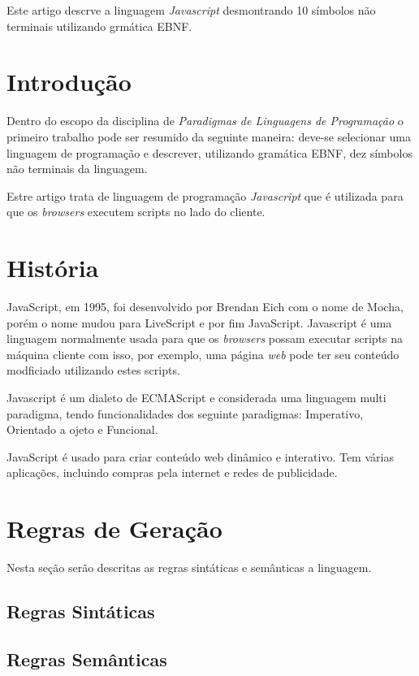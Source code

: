 \documentclass[
	article,			%
	11pt,				%
	oneside,			%
	a4paper,			%
	english,			%
	brazil,				%
	]{abntex2}
\begin{document}
\frenchspacing 

\maketitle

\begin{resumoumacoluna}
    
    Este artigo descrve a linguagem \emph{Javascript} desmontrando 10 símbolos
    não terminais utilizando grmática EBNF. 

 \vspace{\onelineskip}
 
 \noindent
\end{resumoumacoluna}

\textual

\section*{Introdução}

    Dentro do escopo da disciplina de \emph{Paradigmas de Linguagens de
    Programação} o primeiro trabalho pode ser resumido da seguinte maneira:
    deve-se selecionar uma linguagem de programação e descrever, utilizando
    gramática EBNF, dez símbolos não terminais da linguagem.
    
    Estre artigo trata de linguagem de programação \emph{Javascript} que é
    utilizada para que os \emph{browsers} executem scripts no lado do cliente.

\section{História}

    JavaScript, em 1995, foi desenvolvido por Brendan Eich com o nome de Mocha, porém o nome mudou para LiveScript e por fim JavaScript. Javascript é uma linguagem normalmente usada para que os \emph{browsers} possam executar scripts na máquina cliente com isso, por exemplo, uma página \emph{web} pode ter seu conteúdo modficiado utilizando estes scripts. 
    
    Javascript é um dialeto de ECMAScript e considerada uma linguagem multi paradigma, tendo funcionalidades dos seguinte paradigmas: Imperativo, Orientado a ojeto e Funcional.
   
    JavaScript é usado para criar conteúdo web dinâmico e interativo. Tem várias aplicações, incluindo compras pela internet e redes de publicidade.
\section{Regras de Geração}
    Nesta seção serão descritas as regras sintáticas e semânticas a linguagem.
    \subsection{Regras Sintáticas}
    
    \subsection{Regras Semânticas}
\end{document}
